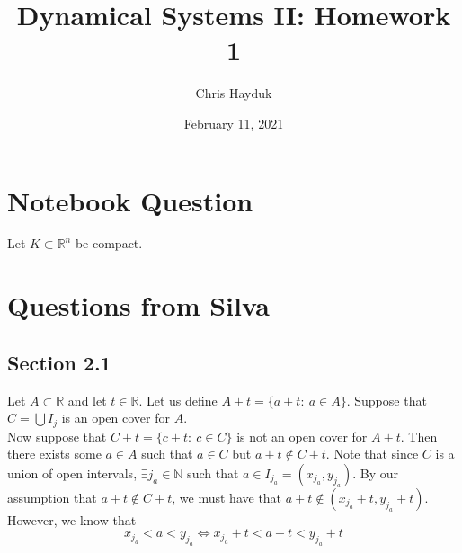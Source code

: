 \documentclass[12pt]{article}
\newenvironment{problem}[2][Problem]{\begin{trivlist}
\item[\hskip \labelsep {\bfseries #1}\hskip \labelsep {\bfseries #2.}]}{\end{trivlist}}
\begin{document}
\title{Dynamical Systems II: Homework 1}

\author{Chris Hayduk}
\date{February 11, 2021}

\maketitle

\section{Notebook Question}

\begin{problem}{1}
\end{problem}

Let $K \subset \mathbb{R}^n$ be compact.

\begin{problem}{2}
\end{problem}

\begin{problem}{3}
\end{problem}

\section{Questions from Silva}

\subsection{Section 2.1}

\begin{problem}{3}
\end{problem}

\begin{problem}{4}
\end{problem}

Let $A \subset \mathbb{R}$ and let $t \in \mathbb{R}$. Let us define $A + t = \{a + t: \ a \in A\}$. Suppose that $C = \bigcup I_j$ is an open cover for $A$.\\

Now suppose that $C + t = \{c + t: \ c \in C\}$ is not an open cover for $A + t$. Then there exists some $a \in A$ such that $a \in C$ but $a + t \not\in C + t$. Note that since $C$ is a union of open intervals, $\exists j_a \in \mathbb{N}$ such that $a \in I_{j_a} = (x_{j_a}, y_{j_a})$. By our assumption that $a + t \not\in C + t$, we must have that $a + t \not\in (x_{j_a} + t, y_{j_a} + t)$. However, we know that $$x_{j_a} < a < y_{j_a} \iff x_{j_a} + t < a + t < y_{j_a} + t$$
\end{document}
